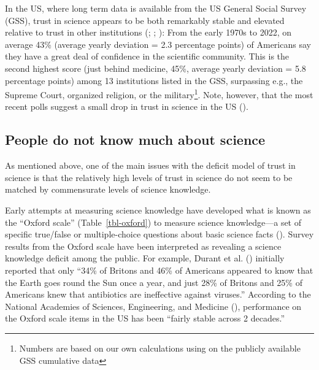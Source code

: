 \documentclass[
  man,
  floatsintext,
  longtable,
  nolmodern,
  notxfonts,
  notimes,
  colorlinks=true,linkcolor=blue,citecolor=blue,urlcolor=blue]{apa7}
\begin{document}
In the US, where long term data is available from the US General Social
Survey (GSS), trust in science appears to be both remarkably stable and
elevated relative to trust in other institutions
(;
; ): From the early 1970s to 2022, on average 43\% (average yearly
deviation = 2.3 percentage points) of Americans say they have a great
deal of confidence in the scientific community. This is the second
highest score (just behind medicine, 45\%, average yearly deviation =
5.8 percentage points) among 13 institutions listed in the GSS,
surpassing e.g., the Supreme Court, organized religion, or the
military\footnote{Numbers are based on our own calculations using on the
  publicly available GSS cumulative data}. Note, however, that the most
recent polls suggest a small drop in trust in science in the US
().

\subsection{People do not know much about
science}\label{people-do-not-know-much-about-science}

As mentioned above, one of the main issues with the deficit model of
trust in science is that the relatively high levels of trust in science
do not seem to be matched by commensurate levels of science knowledge.

Early attempts at measuring science knowledge have developed what is
known as the ``Oxford scale'' (Table~\ref{tbl-oxford}) to measure
science knowledge---a set of specific true/false or multiple-choice
questions about basic science facts
(). Survey results
from the Oxford scale have been interpreted as revealing a science
knowledge deficit among the public. For example, Durant et al.
()
initially reported that only ``34\% of Britons and 46\% of Americans
appeared to know that the Earth goes round the Sun once a year, and just
28\% of Britons and 25\% of Americans knew that antibiotics are
ineffective against viruses.'' According to the National Academies of
Sciences, Engineering, and Medicine
(), performance on the Oxford scale items in the US has been
``fairly stable across 2 decades.''
\end{document}
